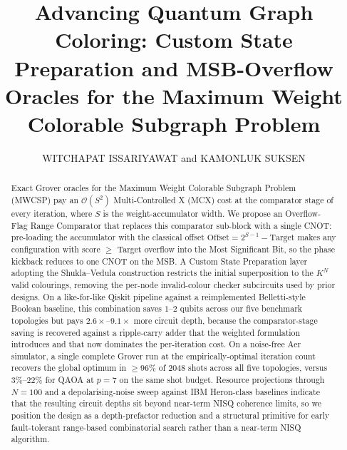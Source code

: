 \documentclass{ieeeaccess}
\begin{document}

\title{Advancing Quantum Graph Coloring: Custom State Preparation and MSB-Overflow Oracles for the Maximum Weight Colorable Subgraph Problem}
\author{\uppercase{Witchapat Issariyawat} and \uppercase{Kamonluk Suksen}}
\address[1]{Department of Computer Engineering, Chulalongkorn University, Bangkok, Thailand 10330 (e-mail: witchapat.iss@student.chula.ac.th; kamonluk@cp.eng.chula.ac.th)}


\begin{abstract}
Exact Grover oracles for the Maximum Weight Colorable Subgraph Problem (MWCSP) pay an $\mathcal{O}(S^2)$ Multi-Controlled X (MCX) cost at the comparator stage of every iteration, where $S$ is the weight-accumulator width. We propose an Overflow-Flag Range Comparator that replaces this comparator sub-block with a single CNOT: pre-loading the accumulator with the classical offset $\text{Offset} = 2^{S-1}-\text{Target}$ makes any configuration with score $\ge$ Target overflow into the Most Significant Bit, so the phase kickback reduces to one CNOT on the MSB. A Custom State Preparation layer adopting the Shukla--Vedula construction restricts the initial superposition to the $K^N$ valid colourings, removing the per-node invalid-colour checker subcircuits used by prior designs. On a like-for-like Qiskit pipeline against a reimplemented Belletti-style Boolean baseline, this combination saves $1$--$2$ qubits across our five benchmark topologies but pays $2.6\times$--$9.1\times$ more circuit depth, because the comparator-stage saving is recovered against a ripple-carry adder that the weighted formulation introduces and that now dominates the per-iteration cost. On a noise-free Aer simulator, a single complete Grover run at the empirically-optimal iteration count recovers the global optimum in $\ge 96\%$ of $2048$ shots across all five topologies, versus $3\%$--$22\%$ for QAOA at $p=7$ on the same shot budget. Resource projections through $N=100$ and a depolarising-noise sweep against IBM Heron-class baselines indicate that the resulting circuit depths sit beyond near-term NISQ coherence limits, so we position the design as a depth-prefactor reduction and a structural primitive for early fault-tolerant range-based combinatorial search rather than a near-term NISQ algorithm.
\end{abstract}
\end{document}
